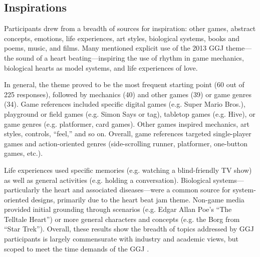 \documentclass{sig-alternate}
\begin{document}

\subsection{Inspirations}
Participants drew from a breadth of sources for inspiration: other games, abstract concepts, emotions, life experiences, art styles, biological systems, books and poems, music, and films. Many mentioned explicit use of the 2013 GGJ theme---the sound of a heart beating---inspiring the use of rhythm in game mechanics, biological hearts as model systems, and life experiences of love. 

In general, the theme proved to be the most frequent starting point (60 out of 225 responses), followed by mechanics (40) and other games (39) or game genres (34).
Game references included specific digital games (e.g. Super Mario Bros.), playground or field games (e.g. Simon Says or tag), tabletop games (e.g. Hive), or game genres (e.g. platformer, card games). Other games inspired mechanics, art styles, controls, ``feel,'' and so on. 
Overall, game references targeted single-player games and action-oriented genres (side-scrolling runner, platformer, one-button games, etc.).

Life experiences used specific memories (e.g. watching a blind-friendly TV show) as well as general activities (e.g. holding a conversation).
Biological systems---particularly the heart and associated diseases---were a common source for system-oriented designs, primarily due to the heart beat jam theme.
Non-game media provided initial grounding through scenarios (e.g. Edgar Allan Poe's ``The Telltale Heart'') or more general characters and concepts (e.g. the Borg from ``Star Trek'').
Overall, these results show the breadth of topics addressed by GGJ participants is largely commensurate with industry and academic views, but scoped to meet the time demands of the GGJ \cite{bogost2011:howto}.
\end{document}
